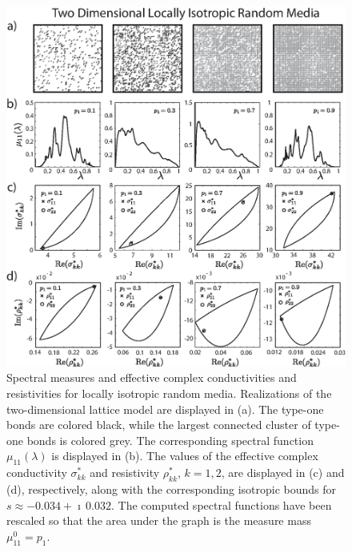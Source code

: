 \documentclass{cmslatex}
\begin{document}
%
\begin{figure}[t]
  \centerline{\includegraphics[scale=0.73]{A_Locally_Isotropic_RRN_11.eps}}
\caption{Spectral measures and effective complex conductivities and
  resistivities for locally isotropic random media. Realizations of
  the two-dimensional lattice model are displayed in (a). The type-one
  bonds are colored black, while the largest connected cluster of
  type-one bonds is colored grey. The corresponding spectral function
  $\mu_{11}(\lambda)$ is displayed in (b). The values of the effective complex
  conductivity $\sigma^*_{kk}$ and resistivity $\rho^*_{kk}$, $k=1,2$, are
  displayed in (c) and (d), respectively, along with the corresponding
  isotropic bounds for   $s\approx-0.034+\imath\,0.032$. The computed spectral
  functions have been rescaled so that the area under the graph is the
  measure mass $\mu^0_{11}=p_1$.    
        } 
\label{fig:LocIsotropic_RRN_11}
\end{figure}
%


   
\end{document}
